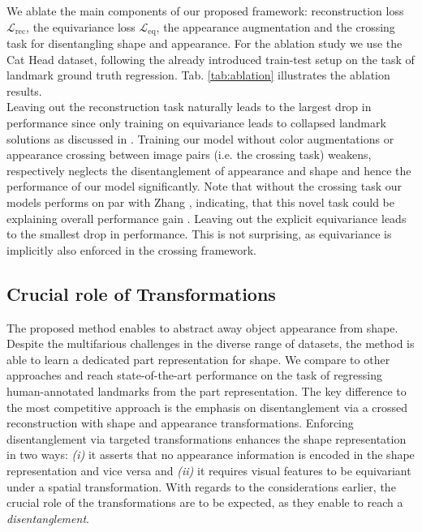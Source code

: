 			We ablate the main components of our proposed framework: reconstruction loss $\mathcal{L}_{\textrm{rec}}$, the equivariance loss $\mathcal{L}_{\textrm{eq}}$, the appearance augmentation and the crossing task for disentangling shape and appearance. For the ablation study we use the Cat Head dataset, following the already introduced train-test setup on the task of landmark ground truth regression. Tab. \ref{tab:ablation} illustrates the ablation results.\\
			Leaving out the reconstruction task naturally leads to the largest drop in performance since only training on equivariance leads to collapsed landmark solutions as discussed in \cite{zhang18}.
			Training our model without color augmentations or appearance crossing between image pairs (i.e. the crossing task) weakens, respectively neglects the disentanglement of appearance and shape and hence the performance of our model significantly. %
			Note that without the crossing task our models performs on par with Zhang \etal \cite{zhang18}, indicating, that this novel task could be explaining overall performance gain \wrt \cite{zhang18}. %
			Leaving out the explicit equivariance leads to the smallest drop in performance. This is not surprising, as equivariance is implicitly also enforced in the crossing framework.

	\subsection{Crucial role of Transformations}
		The proposed method enables to abstract away object appearance from shape.
		Despite the multifarious challenges in the diverse range of datasets, the method is able to learn a dedicated part representation for shape.
		We compare to other approaches and reach state-of-the-art performance on the task of regressing human-annotated landmarks from the part representation.
		The key difference to the most competitive approach \cite{zhang18} is the emphasis on disentanglement via a crossed reconstruction with shape and appearance transformations.
		Enforcing disentanglement via targeted transformations enhances the shape representation in two ways: \emph{(i)} it asserts that no appearance information is encoded in the shape representation and vice versa and \emph{(ii)} it requires visual features to be equivariant under a spatial transformation.
		With regards to the considerations earlier, the crucial role of the transformations are to be expected, as they enable to reach a \textit{disentanglement}.
